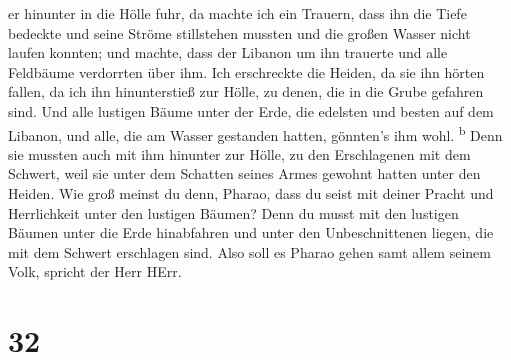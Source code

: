 er hinunter in die Hölle fuhr, da machte ich ein Trauern, dass ihn die
Tiefe bedeckte und seine Ströme stillstehen mussten und die großen
Wasser nicht laufen konnten; und machte, dass der Libanon um ihn
trauerte und alle Feldbäume verdorrten über ihm.  Ich
erschreckte die Heiden, da sie ihn hörten fallen, da ich ihn
hinunterstieß zur Hölle, zu denen, die in die Grube gefahren sind. Und
alle lustigen Bäume unter der Erde, die edelsten und besten auf dem
Libanon, und alle, die am Wasser gestanden hatten, gönnten's ihm wohl.
\textsuperscript{b}  Denn sie mussten auch mit ihm
hinunter zur Hölle, zu den Erschlagenen mit dem Schwert, weil sie unter
dem Schatten seines Armes gewohnt hatten unter den Heiden.
 Wie groß meinst du denn, Pharao, dass du seist mit
deiner Pracht und Herrlichkeit unter den lustigen Bäumen? Denn du musst
mit den lustigen Bäumen unter die Erde hinabfahren und unter den
Unbeschnittenen liegen, die mit dem Schwert erschlagen sind. Also soll
es Pharao gehen samt allem seinem Volk, spricht der Herr HErr.

\hypertarget{section-31}{%
\section{32}\label{section-31}}

